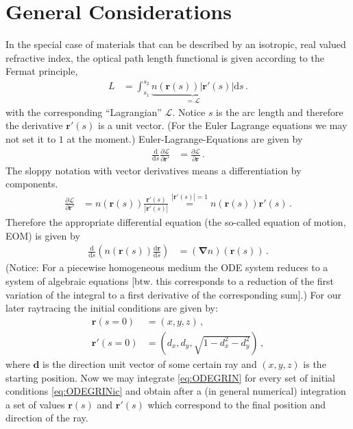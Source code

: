 \documentclass[12pt,a4paper,twoside,openright,BCOR10mm,headsepline,titlepage,abstracton,chapterprefix,final]{scrreprt}
\newcommand\Vector[1]{{\mathbf{#1}}}
\begin{document}
\section{General Considerations}
In the special case of materials that can be described by an isotropic, real valued refractive index, the optical path length functional is given according to the Fermat principle,
\begin{align}
 L &= \int_{s_1}^{s_2} \underbrace{n(\Vector{r}(s)) |\Vector{r}'(s)|}_{=\mathcal{L}} \text{d}s\,.\label{eq:fermatiso}
\end{align}
with the corresponding ``Lagrangian'' $\mathcal{L}$.
Notice $s$ is the arc length and therefore the derivative $\Vector{r}'(s)$ is a unit vector. (For the Euler Lagrange
equations we may not set it to $1$ at the moment.)
Euler-Lagrange-Equations are given by
\begin{align}
 \frac{\text{d}}{\text{d}s} \frac{\partial \mathcal{L}}{\partial \Vector{r}'} &= \frac{\partial \mathcal{L}}{\partial \Vector{r}}\,.
\end{align}
The sloppy notation with vector derivatives means a differentiation by components.
\begin{align}
 \frac{\partial \mathcal{L}}{\partial \Vector{r}'} &= n(\Vector{r}(s)) \frac{\Vector{r}'(s)}{|\Vector{r}'(s)|} \stackrel{|\Vector{r}'(s)|=1}{=} n(\Vector{r}(s))\Vector{r}'(s)\,.
\end{align}
Therefore the appropriate differential equation (the so-called equation of motion, EOM) is given by
\begin{align}
 \frac{\text{d}}{\text{d}s} \left(n(\Vector{r}(s)) \frac{\text{d}\Vector{r}}{\text{d}s}\right) &= (\Vector{\nabla} n)(\Vector{r}(s)) \label{eq:ODEGRIN}\,.
\end{align}
(Notice: For a piecewise homogeneous medium the ODE system reduces to a system of algebraic equations 
[btw. this corresponds to a reduction of the
first variation of the integral to a first derivative of the corresponding sum].) 
For our later raytracing the initial conditions are given by:
\begin{subequations}
\label{eq:ODEGRINic}
\begin{align}
 \Vector{r}(s=0) &= (x,y,z)\,,\\
 \Vector{r}'(s=0) &= (d_x, d_y, \sqrt{1-d_x^2-d_y^2})\,,
\end{align}
\end{subequations}
where $\Vector{d}$ is the direction unit vector of some certain ray and $(x,y,z)$ is the starting position.
Now we may integrate \eqref{eq:ODEGRIN} for every set of initial conditions \eqref{eq:ODEGRINic}
and obtain after a (in general numerical) integration a set of values $\Vector{r}(s)$ and $\Vector{r}'(s)$
which correspond to the final position and direction of the ray.
\end{document}
